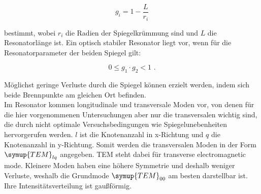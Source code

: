     \begin{equation}
        g_i = 1 -\frac{L}{r_i}
    \end{equation}

    bestimmt, wobei $r_i$ die Radien der Spiegelkrümmung sind und $L$ die Resonatorlänge ist.
    Ein optisch stabiler Resonator liegt vor, wenn für die Resonatorparameter der beiden Spiegel gilt:

    \begin{equation}
        0 \leq g_1 \cdot g_2 < 1\,\,.
    \end{equation}

    Möglichst geringe Verluste durch die Spiegel können erzielt werden, indem sich beide Brennpunkte am gleichen
    Ort befinden.\\

    Im Resonator kommen longitudinale und transversale Moden vor, von denen für die hier vorgenommenen Untersuchungen aber nur
    die transversalen wichtig sind, die durch nicht optimale Versuchsbedingungen wie Spiegelunebenheiten hervorgerufen werden.
    $l$ ist die Knotenanzahl in x-Richtung und $q$ die Knotenanzahl in y-Richtung.
    Somit werden die transversalen Moden in der Form $\symup{TEM}_{lq}$ angegeben.
    TEM steht dabei für transverse electromagnetic mode.
    Kleinere Moden haben eine höhere Symmetrie und deshalb weniger Verluste, weshalb die Grundmode $\symup{TEM}_{00}$
    am besten darstellbar ist. Ihre Intensitätsverteilung ist gaußförmig.

